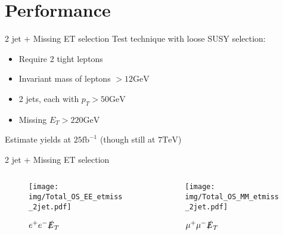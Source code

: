 \documentclass{beamer}
\begin{document}
\section{Performance}

\begin{frame}{2 jet + Missing ET selection}
Test technique with loose SUSY selection:
\begin{itemize}
\item Require 2 tight leptons
\item Invariant mass of leptons $> 12\text{GeV}$
\item 2 jets, each with $p_T > 50\text{GeV}$
\item Missing $E_T > 220\text{GeV}$
\end{itemize}
Estimate yields at $25\text{fb}^{-1}$ (though still at $7 \text{TeV}$)
\end{frame}

\begin{frame}{2 jet + Missing ET selection}
  \begin{columns}
    \begin{column}{0.5\textwidth}\begin{figure}
      \texttt{[image: img/Total\_OS\_EE\_etmiss\_2jet.pdf]}
      \caption{$e^{+}e^{-}\slashed{E}_{T}$}
    \end{figure}\end{column}
    \begin{column}{0.5\textwidth}\begin{figure}
      \texttt{[image: img/Total\_OS\_MM\_etmiss\_2jet.pdf]}
      \caption{$\mu^{+}\mu^{-}\slashed{E}_{T}$}
    \end{figure}\end{column}
  \end{columns}
\end{frame}

\end{document}
